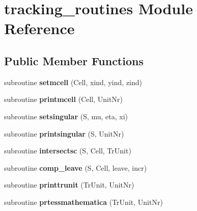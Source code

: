 \hypertarget{classtracking__routines}{\section{tracking\-\_\-routines Module Reference}
\label{classtracking__routines}
}
\subsection*{Public Member Functions}
\begin{DoxyCompactItemize}
\item 
\hypertarget{classtracking__routines_aad92af6cbe8c7f4259002b499bf58bc5}{subroutine {\bfseries setmcell} (Cell, xind, yind, zind)}\label{classtracking__routines_aad92af6cbe8c7f4259002b499bf58bc5}

\item 
\hypertarget{classtracking__routines_a6235e8542f7e718ea025c5203e905a84}{subroutine {\bfseries printmcell} (Cell, Unit\-Nr)}\label{classtracking__routines_a6235e8542f7e718ea025c5203e905a84}

\item 
\hypertarget{classtracking__routines_a502e556352c00b37b2a87bbb0bf5dce9}{subroutine {\bfseries setsingular} (S, mu, eta, xi)}\label{classtracking__routines_a502e556352c00b37b2a87bbb0bf5dce9}

\item 
\hypertarget{classtracking__routines_a1655a5aa67ae5776695d1b328396615c}{subroutine {\bfseries printsingular} (S, Unit\-Nr)}\label{classtracking__routines_a1655a5aa67ae5776695d1b328396615c}

\item 
\hypertarget{classtracking__routines_a1ee5d1f821bf5937b20824e5a5cb2ad8}{subroutine {\bfseries intersectsc} (S, Cell, Tr\-Unit)}\label{classtracking__routines_a1ee5d1f821bf5937b20824e5a5cb2ad8}

\item 
\hypertarget{classtracking__routines_a8bacd5c5f9409cee03ca0a49f6c5370b}{subroutine {\bfseries comp\-\_\-leave} (S, Cell, leave, incr)}\label{classtracking__routines_a8bacd5c5f9409cee03ca0a49f6c5370b}

\item 
\hypertarget{classtracking__routines_acbf11a0ab0b8ccd9d30934b3a3bef605}{subroutine {\bfseries printtrunit} (Tr\-Unit, Unit\-Nr)}\label{classtracking__routines_acbf11a0ab0b8ccd9d30934b3a3bef605}

\item 
\hypertarget{classtracking__routines_a9c2af9144fbcc93ef09b2ffab4492ec8}{subroutine {\bfseries prtessmathematica} (Tr\-Unit, Unit\-Nr)}\label{classtracking__routines_a9c2af9144fbcc93ef09b2ffab4492ec8}


\end{DoxyCompactItemize}
